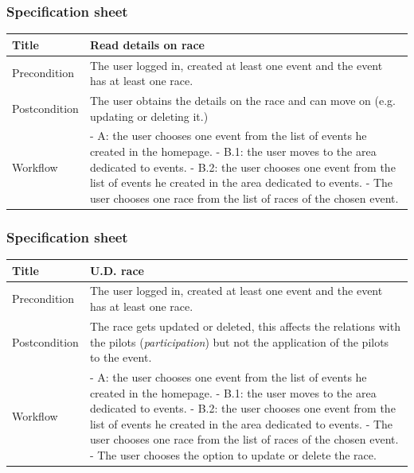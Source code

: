 \documentclass{beamer}
\begin{document}
\begin{frame}
    \frametitle{Specification sheet}
    \begin{table}
        \tiny
        \begin{tabular}{|p{2cm}|p{6cm}|}
        \hline
        Title & \textbf{Read details on race} \\
        \hline
        Precondition & The user logged in, created at least one event and the event has at least one race. \\
        \hline
        Postcondition & The user obtains the details on the race and can move on (e.g. updating or deleting it.) \\
        \hline
        Workflow &
        - A: the user chooses one event from the list of events he created in the homepage. \newline
        - B.1: the user moves to the area dedicated to events. \newline
        - B.2: the user chooses one event from the list of events he created in the area dedicated to events. \newline
        - The user chooses one race from the list of races of the chosen event. \\
        \hline
        \end{tabular}
\end{table}
\end{frame}


\begin{frame}
    \frametitle{Specification sheet}
    \begin{table}
        \tiny
        \begin{tabular}{|p{2cm}|p{6cm}|}
        \hline
        Title & \textbf{U.D. race} \\
        \hline
        Precondition & The user logged in, created at least one event and the event has at least one race. \\
        \hline
        Postcondition & The race gets updated or deleted, this affects the relations with the pilots (\textit{participation})
        but not the application of the pilots to the event. \\
        \hline
        Workflow &
        - A: the user chooses one event from the list of events he created in the homepage. \newline
        - B.1: the user moves to the area dedicated to events. \newline
        - B.2: the user chooses one event from the list of events he created in the area dedicated to events. \newline
        - The user chooses one race from the list of races of the chosen event. \newline
        - The user chooses the option to update or delete the race. \\
        \hline
        \end{tabular}
\end{table}
\end{frame}
\end{document}
